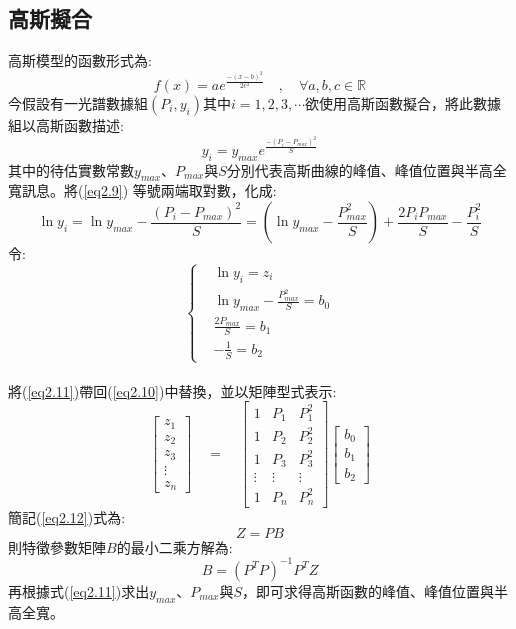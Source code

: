 \subsection{高斯擬合}
高斯模型的函數\cite{Lorentz_AND_GAUSSIAN_book}形式為:
\begin{equation}\label{eq2.8}
	f(x)=a e^{\frac{-(x-b)^2}{2c^2}} \quad , \quad \forall a,b,c \in \mathbf{\mathbb{R}}
\end{equation}
今假設有一光譜數據組$(P_i,y_i)$其中$i=1,2,3,\cdots$欲使用高斯函數擬合，將此數據組以高斯函數描述:
\begin{equation}\label{eq2.9}
	y_i=y_{max} e^{\frac{-(P_i-P_{max})^2}{S}}
\end{equation}
其中的待估實數常數$y_{max}$、$P_{max}$與$S$分別代表高斯曲線的峰值、峰值位置與半高全寬訊息。將(\ref{eq2.9})
等號兩端取對數，化成:
\begin{equation}\label{eq2.10}
	\ln{y_i}=\ln{y_{max}}-\frac{(P_i-P_{max})^2}{S} = (\ln{y_{max}}-\frac{P_{max}^{2}}{S})+\frac{2P_i P_{max}}{S}-\frac{P_{i}^{2}}{S}
\end{equation}
令: 
\begin{equation}\label{eq2.11}
	\begin{cases}
		& \ln{y_i} = z_i \\
		& \ln{y_{max}}-\frac{P_{max}^{2}}{S} = b_0\\
		& \frac{2 P_{max}}{S} = b_1\\
		&  -\frac{1}{S} = b_2
		\end{cases}
\end{equation}\\
將(\ref{eq2.11})帶回(\ref{eq2.10})中替換，並以矩陣型式表示:
\\
\begin{equation}\label{eq2.12}
\begin{bmatrix} z_1\\z_2\\z_3\\ \vdots\\z_n\end{bmatrix} 
 \quad
= 
 \quad
 \begin{bmatrix} 
 	1&P_1&P_{1}^{2}\\
 	1&P_2&P_{2}^{2}\\
 	1&P_3&P_{3}^{2}\\
 	\vdots&\vdots&\vdots\\
 	1&P_n&P_{n}^{2}
 \end{bmatrix}
\begin{bmatrix} b_0\\b_1\\b_2 \end{bmatrix} 
\end{equation}
簡記(\ref{eq2.12})式為:
\begin{equation}\label{eq2.13}
  Z = PB
\end{equation}
則特徵參數矩陣$B$的最小二乘方解\cite{Least-Squart-method}為:
\begin{equation}\label{eq2.14}
	B = (P^TP)^{-1}P^T Z
\end{equation}
再根據式(\ref{eq2.11})求出$y_{max}$、$P_{max}$與$S$，即可求得高斯函數的峰值、峰值位置與半高全寬。

